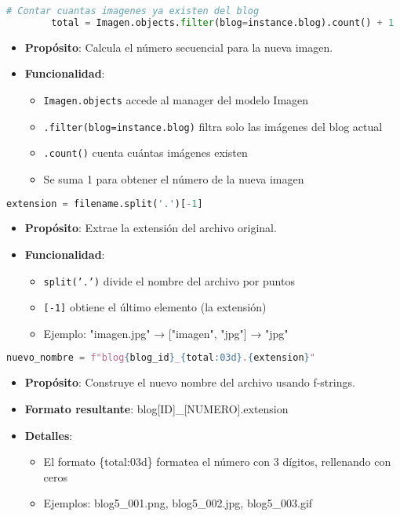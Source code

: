 \documentclass[11pt,a4paper]{report}
\begin{document}
	\begin{lstlisting}[language=Python]
		# Contar cuantas imagenes ya existen del blog
		total = Imagen.objects.filter(blog=instance.blog).count() + 1
	\end{lstlisting}
	\begin{itemize}
		\item \textbf{Propósito}: Calcula el número secuencial para la nueva imagen.
		\item \textbf{Funcionalidad}:
		\begin{itemize}
			\item \texttt{Imagen.objects} accede al manager del modelo Imagen
			\item \texttt{.filter(blog=instance.blog)} filtra solo las imágenes del blog actual
			\item \texttt{.count()} cuenta cuántas imágenes existen
			\item Se suma 1 para obtener el número de la nueva imagen
		\end{itemize}
	\end{itemize}
	
	\begin{lstlisting}[language=Python]
		extension = filename.split('.')[-1]
	\end{lstlisting}
	\begin{itemize}
		\item \textbf{Propósito}: Extrae la extensión del archivo original.
		\item \textbf{Funcionalidad}:
		\begin{itemize}
			\item \texttt{split('.')} divide el nombre del archivo por puntos
			\item \texttt{[-1]} obtiene el último elemento (la extensión)
			\item Ejemplo: "imagen.jpg" → ["imagen", "jpg"] → "jpg"
		\end{itemize}
	\end{itemize}
	
	\begin{lstlisting}[language=Python]
		nuevo_nombre = f"blog{blog_id}_{total:03d}.{extension}"
	\end{lstlisting}
	\begin{itemize}
		\item \textbf{Propósito}: Construye el nuevo nombre del archivo usando f-strings.
		\item \textbf{Formato resultante}: blog[ID]\_[NUMERO].extension
		\item \textbf{Detalles}:
		\begin{itemize}
			\item El formato \{total:03d\} formatea el número con 3 dígitos, rellenando con ceros
			\item Ejemplos: blog5\_001.png, blog5\_002.jpg, blog5\_003.gif
		\end{itemize}
	\end{itemize}
	
\end{document}
